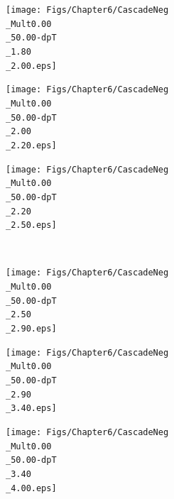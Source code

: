\begin{landscape}
\begin{figure}[h]
\begin{minipage}[t]{.25\textwidth}
        \texttt{[image: Figs/Chapter6/CascadeNeg\\\_Mult0.00\\\_50.00-dpT\\\_1.80\\\_2.00.eps]}
    \end{minipage}
    \hfill
    \begin{minipage}[t]{.25\textwidth}
		\hspace*{-2.5cm}
        \texttt{[image: Figs/Chapter6/CascadeNeg\\\_Mult0.00\\\_50.00-dpT\\\_2.00\\\_2.20.eps]}
    \end{minipage}
    \hfill
    \begin{minipage}[t]{.25\textwidth}
		\hspace*{-2.5cm}
        \texttt{[image: Figs/Chapter6/CascadeNeg\\\_Mult0.00\\\_50.00-dpT\\\_2.20\\\_2.50.eps]}
    \end{minipage}  \\
    \begin{minipage}[t]{.25\textwidth}
        \hspace*{-2.5cm}
        \texttt{[image: Figs/Chapter6/CascadeNeg\\\_Mult0.00\\\_50.00-dpT\\\_2.50\\\_2.90.eps]}
    \end{minipage}
    \hfill
    \begin{minipage}[t]{.25\textwidth}
        \hspace*{-2.5cm}
        \texttt{[image: Figs/Chapter6/CascadeNeg\\\_Mult0.00\\\_50.00-dpT\\\_2.90\\\_3.40.eps]}
    \end{minipage}
    \hfill
    \begin{minipage}[t]{.25\textwidth}
		\hspace*{-2.5cm}
        \texttt{[image: Figs/Chapter6/CascadeNeg\\\_Mult0.00\\\_50.00-dpT\\\_3.40\\\_4.00.eps]}

\end{minipage}
\end{figure}
\end{landscape}
